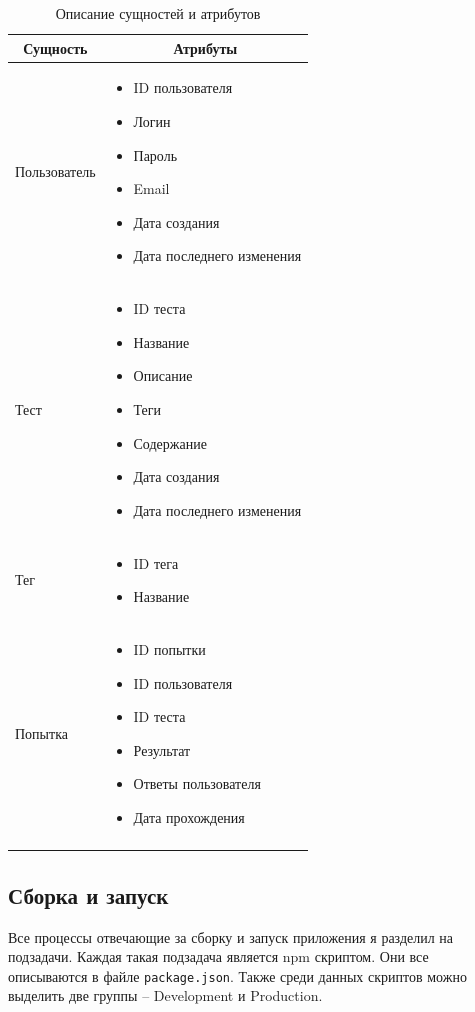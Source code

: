 \begin{longtable}[c]{|l|p{6.5cm}|}
    \hline
    \multicolumn{1}{|c|}{\textbf{Сущность}} & \multicolumn{1}{c|}{\textbf{Атрибуты}}
    \\ \hline
    Пользователь & \begin{itemize}
        \item ID пользователя
        \item Логин
        \item Пароль
        \item Email
        \item Дата создания
        \item Дата последнего изменения
    \end{itemize} \\ \hline
    Тест & \begin{itemize}
        \item ID теста
        \item Название
        \item Описание
        \item Теги
        \item Содержание
        \item Дата создания
        \item Дата последнего изменения
    \end{itemize} \\ \hline
    Тег & \begin{itemize}
        \item ID тега
        \item Название
    \end{itemize}
    \\ \hline
    Попытка & \begin{itemize}
        \item ID попытки
        \item ID пользователя
        \item ID теста
        \item Результат
        \item Ответы пользователя
        \item Дата прохождения
    \end{itemize}
    \\ \hline
    \caption{Описание сущностей и атрибутов}
\end{longtable}

\subsection{Сборка и запуск}
Все процессы отвечающие за сборку и запуск приложения я разделил на подзадачи. Каждая такая подзадача является npm скриптом. Они все описываются в файле \texttt{package.json}. Также среди данных скриптов можно выделить две группы -- Development и Production.

